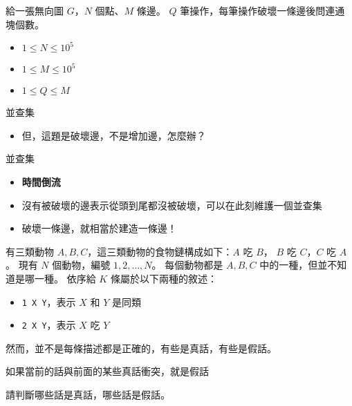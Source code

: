 \documentclass[standalone]{beamer}
\begin{document}
\begin{frame}{}
  \begin{problem}
    給一張無向圖 $G$，$N$ 個點、$M$ 條邊。
    $Q$ 筆操作，每筆操作破壞一條邊後問連通塊個數。

    \begin{itemize}
        \item
            $1 \leq N \leq 10^5$
        \item
            $1 \leq M \leq 10^5$
        \item
            $1 \leq Q \leq M$
    \end{itemize}
  \end{problem}
\end{frame}

\begin{frame}{並查集}
  \begin{itemize}
    \item 但，這題是破壞邊，不是增加邊，怎麼辦？
  \end{itemize}
\end{frame}

\begin{frame}{並查集}
  \begin{itemize}
    \item \textbf{時間倒流}
    \item 沒有被破壞的邊表示從頭到尾都沒被破壞，可以在此刻維護一個並查集
    \item 破壞一條邊，就相當於建造一條邊！
  \end{itemize}
\end{frame}

\begin{frame}{}
  \begin{problem}
    有三類動物 $A, B, C$，這三類動物的食物鏈構成如下：$A$ 吃 $B$， $B$ 吃 $C$，$C$ 吃 $A$。 
    現有 $N$ 個動物，編號 $1, 2, \ldots, N$。
    每個動物都是 $A,B,C$ 中的一種，但並不知道是哪一種。 
    依序給 $K$ 條屬於以下兩種的敘述：
    \begin{itemize}
      \item \texttt{1 X Y}，表示 $X$ 和 $Y$ 是同類
      \item \texttt{2 X Y}，表示 $X$ 吃 $Y$
    \end{itemize}
    然而，並不是每條描述都是正確的，有些是真話，有些是假話。
    
    如果當前的話與前面的某些真話衝突，就是假話
    
    請判斷哪些話是真話，哪些話是假話。
  \end{problem}
\end{frame}
\end{document}
